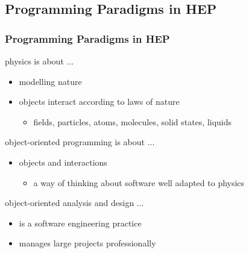 \documentclass[9pt]{beamer}
\begin{document}
\subsection[OOP in HEP]{Programming Paradigms in HEP}
\begin{frame}
\frametitle{Programming Paradigms in HEP}
\normalsize
\begin{block}{physics is about ...}
  \begin{itemize}
  \item \alert<4->{modelling nature}
  \item objects interact according to laws of nature
    \begin{itemize}
    \item fields, particles, atoms, molecules, solid states, liquids
    \end{itemize}
  \end{itemize}
\end{block}
\vfill
\pause
\begin{block}{object-oriented programming is about ...}
  \begin{itemize}
  \item \alert<4->{objects and interactions}
    \begin{itemize}
    \item a way of thinking about software well adapted to
      physics
    \end{itemize}

  \end{itemize}
\end{block}
\vfill
\pause
\begin{block}{object-oriented analysis and design ...}
  \begin{itemize}
  \item is a software engineering practice
  \item \alert<4->{manages large projects professionally}
  \end{itemize}
\end{block}
\end{frame}
\end{document}
